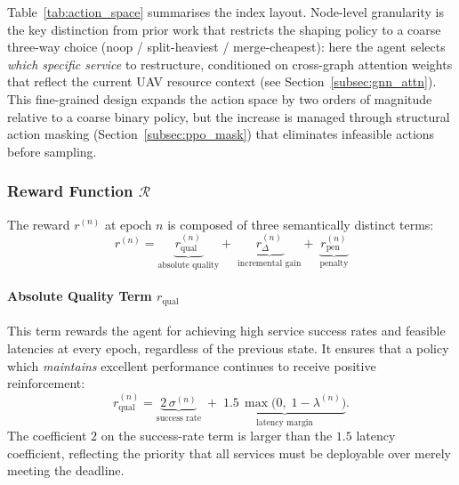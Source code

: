 Table~\ref{tab:action_space} summarises the index layout.
Node-level granularity is the key distinction from prior work
that restricts the shaping policy to a coarse three-way choice
(noop / split-heaviest / merge-cheapest): here the agent
selects \emph{which specific service} to restructure, conditioned
on cross-graph attention weights that reflect the current UAV
resource context (see Section~\ref{subsec:gnn_attn}).
This fine-grained design expands the action space by two orders of
magnitude relative to a coarse binary policy, but the increase is
managed through structural action masking
(Section~\ref{subsec:ppo_mask}) that eliminates infeasible actions
before sampling.

\subsubsection{Reward Function $\mathcal{R}$}
\label{subsubsec:reward}

The reward $r^{(n)}$ at epoch $n$ is composed of three semantically
distinct terms:
\begin{equation}
  \boxed{
  r^{(n)} =
    \underbrace{r_{\mathrm{qual}}^{(n)}}_{\text{absolute quality}}
    +\;
    \underbrace{r_{\Delta}^{(n)}}_{\text{incremental gain}}
    +\;
    \underbrace{r_{\mathrm{pen}}^{(n)}}_{\text{penalty}}
  }
  \label{eq:reward_decomp}
\end{equation}

\paragraph{Absolute Quality Term $r_{\mathrm{qual}}$}

This term rewards the agent for achieving high service success rates
and feasible latencies at every epoch, regardless of the previous
state.
It ensures that a policy which \emph{maintains} excellent performance
continues to receive positive reinforcement:
\begin{equation}
  r_{\mathrm{qual}}^{(n)} =
    \underbrace{2\,\sigma^{(n)}}_{\text{success rate}}
    \;+\;
    \underbrace{1.5\,\max\!\bigl(0,\;1 - \lambda^{(n)}\bigr)}_{\text{latency margin}}.
  \label{eq:r_qual}
\end{equation}
The coefficient $2$ on the success-rate term is larger than the
$1.5$ latency coefficient, reflecting the priority that all services
must be deployable over merely meeting the deadline.


